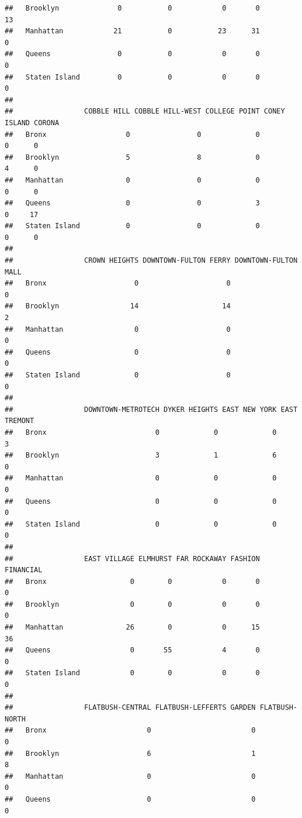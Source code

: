 \documentclass[
]{article}
\begin{document}
\begin{verbatim}
##   Brooklyn              0           0            0       0           13
##   Manhattan            21           0           23      31            0
##   Queens                0           0            0       0            0
##   Staten Island         0           0            0       0            0
##                
##                 COBBLE HILL COBBLE HILL-WEST COLLEGE POINT CONEY ISLAND CORONA
##   Bronx                   0                0             0            0      0
##   Brooklyn                5                8             0            4      0
##   Manhattan               0                0             0            0      0
##   Queens                  0                0             3            0     17
##   Staten Island           0                0             0            0      0
##                
##                 CROWN HEIGHTS DOWNTOWN-FULTON FERRY DOWNTOWN-FULTON MALL
##   Bronx                     0                     0                    0
##   Brooklyn                 14                    14                    2
##   Manhattan                 0                     0                    0
##   Queens                    0                     0                    0
##   Staten Island             0                     0                    0
##                
##                 DOWNTOWN-METROTECH DYKER HEIGHTS EAST NEW YORK EAST TREMONT
##   Bronx                          0             0             0            3
##   Brooklyn                       3             1             6            0
##   Manhattan                      0             0             0            0
##   Queens                         0             0             0            0
##   Staten Island                  0             0             0            0
##                
##                 EAST VILLAGE ELMHURST FAR ROCKAWAY FASHION FINANCIAL
##   Bronx                    0        0            0       0         0
##   Brooklyn                 0        0            0       0         0
##   Manhattan               26        0            0      15        36
##   Queens                   0       55            4       0         0
##   Staten Island            0        0            0       0         0
##                
##                 FLATBUSH-CENTRAL FLATBUSH-LEFFERTS GARDEN FLATBUSH-NORTH
##   Bronx                        0                        0              0
##   Brooklyn                     6                        1              8
##   Manhattan                    0                        0              0
##   Queens                       0                        0              0

\end{verbatim}
\end{document}
